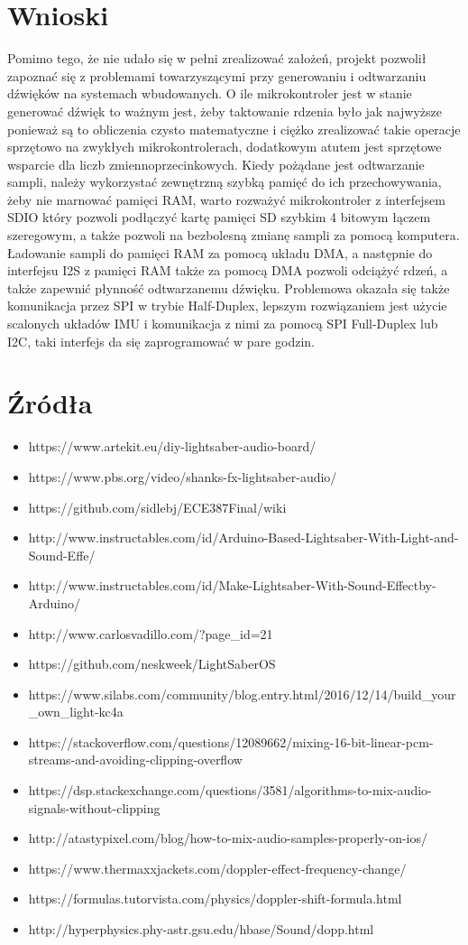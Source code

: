 \documentclass[10pt, a4paper]{article}
\begin{document}
\section{Wnioski}
Pomimo tego, że nie udało się w pełni zrealizować założeń, projekt pozwolił zapoznać się z problemami towarzyszącymi przy generowaniu i odtwarzaniu dźwięków na systemach wbudowanych. O ile mikrokontroler jest w stanie generować dźwięk to ważnym jest, żeby taktowanie rdzenia było jak najwyższe ponieważ są to obliczenia czysto matematyczne i ciężko zrealizować takie operacje sprzętowo na zwykłych mikrokontrolerach, dodatkowym atutem jest sprzętowe wsparcie dla liczb zmiennoprzecinkowych. Kiedy pożądane jest odtwarzanie sampli, należy wykorzystać zewnętrzną szybką pamięć do ich przechowywania, żeby nie marnować pamięci RAM, warto rozważyć mikrokontroler z interfejsem SDIO który pozwoli podłączyć kartę pamięci SD szybkim 4 bitowym łączem szeregowym, a także pozwoli na bezbolesną zmianę sampli za pomocą komputera. Ładowanie sampli do pamięci RAM za pomocą układu DMA, a następnie do interfejsu I2S z pamięci RAM także za pomocą DMA pozwoli odciążyć rdzeń, a także zapewnić płynność odtwarzanemu dźwięku. Problemowa okazała się także komunikacja przez SPI w trybie Half-Duplex, lepszym rozwiązaniem jest użycie scalonych układów IMU i komunikacja z nimi za pomocą SPI Full-Duplex lub I2C, taki interfejs da się zaprogramować w pare godzin.
\section{Źródła}
\begin{itemize}
\item https://www.artekit.eu/diy-lightsaber-audio-board/
\item https://www.pbs.org/video/shanks-fx-lightsaber-audio/
\item https://github.com/sidlebj/ECE387Final/wiki
\item http://www.instructables.com/id/Arduino-Based-Lightsaber-With-Light-and-Sound-Effe/
\item http://www.instructables.com/id/Make-Lightsaber-With-Sound-Effectby-Arduino/
\item http://www.carlosvadillo.com/?page\_id=21
\item https://github.com/neskweek/LightSaberOS
\item https://www.silabs.com/community/blog.entry.html/2016/12/14/build\_your\_own\_light-kc4a
\item https://stackoverflow.com/questions/12089662/mixing-16-bit-linear-pcm-streams-and-avoiding-clipping-overflow
\item https://dsp.stackexchange.com/questions/3581/algorithms-to-mix-audio-signals-without-clipping
\item http://atastypixel.com/blog/how-to-mix-audio-samples-properly-on-ios/
\item https://www.thermaxxjackets.com/doppler-effect-frequency-change/
\item https://formulas.tutorvista.com/physics/doppler-shift-formula.html
\item http://hyperphysics.phy-astr.gsu.edu/hbase/Sound/dopp.html
\end{itemize}



\newpage
{}


\end{document}
